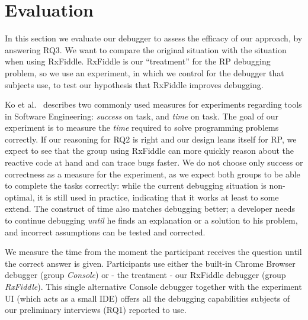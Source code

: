 \section{Evaluation}%
\label{section-evaluation}

In this section we evaluate our debugger to assess the efficacy of our
approach, by answering RQ3.  We want to compare the original situation
with the situation when using RxFiddle.  RxFiddle is our ``treatment''
for the RP debugging problem, so we use an experiment, in which we
control for the debugger that subjects use, to test our hypothesis that
RxFiddle improves debugging.

Ko et al.~\cite{ko2015practical} describes two commonly used measures
for experiments regarding tools in Software Engineering:  \emph{success}
on task, and \emph{time} on task.  The goal of our experiment is to
measure the \textit{time} required to solve programming problems
correctly.  If our reasoning for RQ2 is right and our design leans
itself for RP, we expect to see that the group using RxFiddle can more
quickly reason about the reactive code at hand and can trace bugs
faster.  We do not choose only success or correctness as a measure for
the experiment, as we expect both groups to be able to complete the
tasks correctly:  while the current debugging situation is non-optimal,
it is still used in practice, indicating that it works at least to some
extend.  The construct of time also matches debugging better; a
developer needs to continue debugging \textit{until} he finds an
explanation or a solution to his problem, and incorrect assumptions can
be tested and corrected.

We measure the time from the moment the participant receives the
question until the correct answer is given.  Participants use either the
built-in Chrome Browser debugger (group \emph{Console}) or - the
treatment - our RxFiddle debugger (group \emph{RxFiddle}).  This single
alternative Console debugger together with the experiment UI (which acts
as a small IDE) offers all the debugging capabilities subjects of our
preliminary interviews (RQ1) reported to use.


